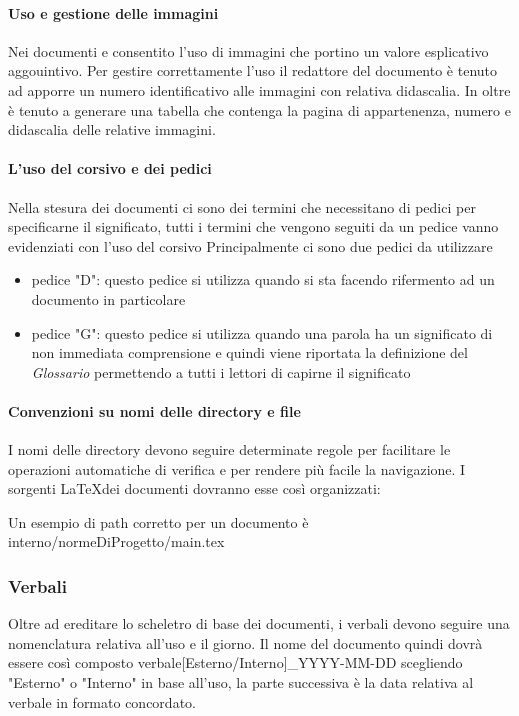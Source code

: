   \paragraph{Uso e gestione delle immagini}
  Nei documenti e consentito l'uso di immagini che portino un valore esplicativo
  aggouintivo.
  Per gestire correttamente l'uso il redattore del documento è tenuto ad apporre
  un numero identificativo alle immagini con relativa didascalia.
  In oltre è tenuto a generare una tabella che contenga la pagina di appartenenza,
  numero e didascalia delle relative immagini.

  \paragraph{L'uso del corsivo e dei pedici}
  Nella stesura dei documenti ci sono dei termini che necessitano di pedici per
  specificarne il significato, tutti i termini che vengono seguiti da un pedice
  vanno evidenziati con l'uso del corsivo
  Principalmente ci sono due pedici da utilizzare
    \begin{itemize}
      \item pedice "D": questo pedice si utilizza quando si sta facendo rifermento
      ad un documento in particolare
      \item pedice "G": questo pedice si utilizza quando una parola ha un significato
      di non immediata comprensione e quindi viene riportata la definizione del
      \textit{Glossario}\doc
      permettendo a tutti i lettori di capirne il significato
    \end{itemize}

  \paragraph{Convenzioni su nomi delle directory e file}
  I nomi delle directory devono seguire determinate regole per facilitare le operazioni
  automatiche di verifica e per rendere più facile la navigazione.
  I sorgenti \LaTeX \space dei documenti dovranno esse così organizzati:


  Un esempio di path corretto per un documento è interno/normeDiProgetto/main.tex
  \subsubsection{Verbali}
  Oltre ad ereditare lo scheletro di base dei documenti, i verbali devono seguire
  una nomenclatura relativa all'uso e il giorno.
  Il nome del documento quindi dovrà essere così composto
  verbale[Esterno/Interno]\_YYYY-MM-DD scegliendo "Esterno" o "Interno" in base
  all'uso, la parte successiva è la data relativa al verbale in formato concordato.

